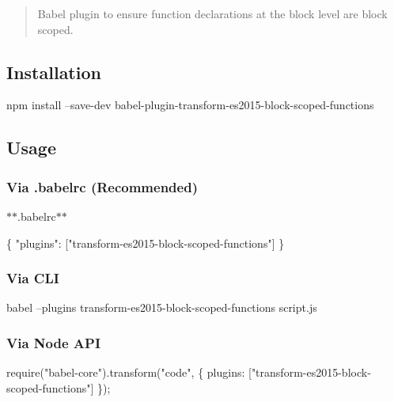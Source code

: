 \begin{quote}
Babel plugin to ensure function declarations at the block level are block scoped. \end{quote}


\subsection*{Installation}


\begin{DoxyCode}
npm install --save-dev babel-plugin-transform-es2015-block-scoped-functions
\end{DoxyCode}


\subsection*{Usage}

\subsubsection*{Via {\ttfamily .babelrc} (Recommended)}

$\ast$$\ast$.babelrc$\ast$$\ast$


\begin{DoxyCode}
\{
  "plugins": ["transform-es2015-block-scoped-functions"]
\}
\end{DoxyCode}


\subsubsection*{Via C\+LI}


\begin{DoxyCode}
babel --plugins transform-es2015-block-scoped-functions script.js
\end{DoxyCode}


\subsubsection*{Via Node A\+PI}


\begin{DoxyCode}
require("babel-core").transform("code", \{
  plugins: ["transform-es2015-block-scoped-functions"]
\});
\end{DoxyCode}
 